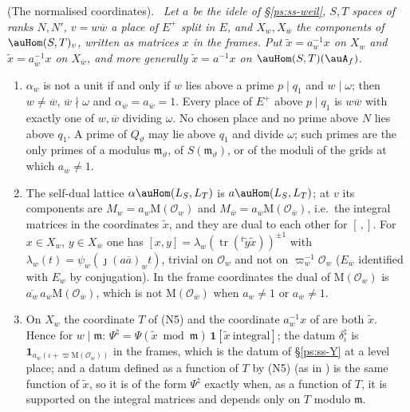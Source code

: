 \documentclass[10pt]{amsart}
\theoremstyle{definition}
\theoremstyle{remark}
\providecommand{\auO}{\mathcal O}
\providecommand{\aubar}[1]{\overline{#1}}
\providecommand{\pcMat}{\mathrm M}
\providecommand{\pcm}{\mathfrak m}
\newenvironment{quotedthm}[2]{\par\medskip\noindent\begingroup
  \textbf{#1}#2.\ \itshape\ignorespaces}{\endgroup\par\medskip}
\begin{document}
\begin{quotedthm}{\cite[Lemma~6.32]{P53}}{ (The normalised coordinates)}
Let $a$ be the idele of \S\ref{ps:ss-weil}, $S,T$ spaces of ranks $N,N'$, $v=w\aubar w$ a place of
$E^+$ split in $E$, and $X_w,X_{\aubar w}$ the components of $\auHom(S,T)_v$, written as matrices $x$
in the frames. Put $\tilde x=a_w^{-1}x$ on $X_w$ and $\tilde x=a_{\aubar w}^{-1}x$ on $X_{\aubar w}$, and
more generally $\tilde x=a^{-1}x$ on $\auHom(S,T)(\auA_f)$.
\begin{enumerate}
\item[(a)] $\alpha_w$ is not a unit if and only if $w$ lies above a prime $p\mid q_1$ and $w\mid\omega$;
then $w\ne\aubar w$, $\aubar w\nmid\omega$ and $\alpha_{\aubar w}=a_{\aubar w}=1$. Every place of $E^+$
above $p\mid q_1$ is $w\aubar w$ with exactly one of $w,\aubar w$ dividing $\omega$. No chosen place
and no prime above $N$ lies above $q_1$. A prime of $Q_\vartheta$ may lie above $q_1$ and divide
$\omega$; such primes are the only primes of a modulus $\pcm_\vartheta$, of $S(\pcm_\vartheta)$, or of
the moduli of the grids at which $a_w\ne1$.
\item[(b)] The self-dual lattice $\alpha\auHom(L_S,L_T)$ is $a\auHom(L_S,L_T)$; at $v$ its components
are $M_w=a_w\pcMat(\auO_w)$ and $M_{\aubar w}=a_{\aubar w}\pcMat(\auO_{\aubar w})$, i.e.\ the integral
matrices in the coordinates $\tilde x$, and they are dual to each other for $[\,,]$. For $x\in X_w$,
$y\in X_{\aubar w}$ one has $[x,y]=\lambda_w(\operatorname{tr}({}^t\tilde y\tilde x))^{\pm1}$ with
$\lambda_w(t)=\psi_w(\jmath(a\aubar a)_wt)$, trivial on $\auO_w$ and not on $\varpi_w^{-1}\auO_w$
($E_{\aubar w}$ identified with $E_w$ by conjugation). In the frame coordinates the dual of
$\pcMat(\auO_w)$ is $\aubar{a_w}\,a_{\aubar w}\pcMat(\auO_{\aubar w})$, which is not
$\pcMat(\auO_{\aubar w})$ when $a_w\ne1$ or $a_{\aubar w}\ne1$.
\item[(c)] On $X_w$ the coordinate $T$ of (N5) and the coordinate $a_w^{-1}x$ of
{\cite[Definition~6.31]{P53}} are both $\tilde x$. Hence for $w\mid\pcm$:
$\Psi^\natural=\Psi(\tilde x\bmod\pcm)\,\mathbf 1[\tilde x\ \text{integral}]$; the datum
$\delta_\iota^\natural$ is $\mathbf 1_{a_w(\iota+\varpi\pcMat(\auO_w))}$ in the frames, which is the
datum of \S\ref{ps:ss-Y} at a level place; and a datum defined as a function of $T$ by (N5) (as in
{\cite[\S\S2.5, 3.2 and~4.1.3]{P54}}) is the same function of $\tilde x$, so it is
of the form $\Psi^\natural$ exactly when, as a function of $T$, it is supported on the integral
matrices and depends only on $T$ modulo $\pcm$.

\end{enumerate}
\end{quotedthm}
\end{document}
